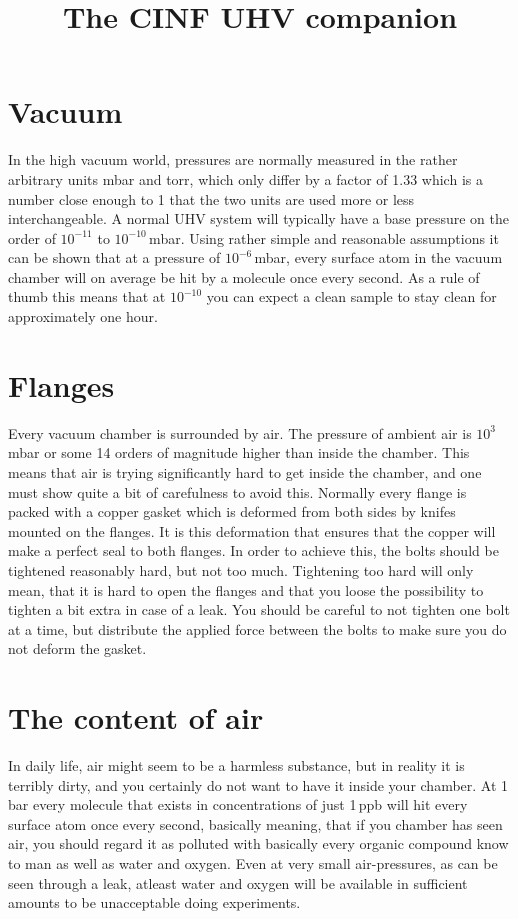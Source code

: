 \documentclass[a4paper,english]{article}
\begin{document}
\title{The CINF UHV companion}

\maketitle

\section{Vacuum}
In the high vacuum world, pressures are normally measured in the rather arbitrary units mbar and torr, which only differ by a factor of 1.33 which is a number close enough to 1 that the two units are used more or less interchangeable. A normal UHV system will typically have a base pressure on the order of $10^{-11}$ to $10^{-10}$\,mbar. Using rather simple and reasonable assumptions it can be shown that at a pressure of $10^{-6}$\,mbar, every surface atom in the vacuum chamber will on average be hit by a molecule once every second. As a rule of thumb this means that at $10^{-10}$ you can expect a clean sample to stay clean for approximately one hour.

\section{Flanges}
Every vacuum chamber is surrounded by air. The pressure of ambient air is $10^3$\,mbar or some 14 orders of magnitude higher than inside the chamber. This means that air is trying significantly hard to get inside the chamber, and one must show quite a bit of carefulness to avoid this. Normally every flange is packed with a copper gasket which is deformed from both sides by knifes mounted on the flanges. It is this deformation that ensures that the copper will make a perfect seal to both flanges. In order to achieve this, the bolts should be tightened reasonably hard, but not too much. Tightening too hard will only mean, that it is hard to open the flanges and that you loose the possibility to tighten a bit extra in  case of a leak. You should be careful to not tighten one bolt at a time, but distribute the applied force between the bolts to make sure you do not deform the gasket.

\section{The content of air}
In daily life, air might seem to be a harmless substance, but in reality it is terribly dirty, and you certainly do not want to have it inside your chamber. At 1\,bar every molecule that exists in concentrations of just 1\,ppb will hit every surface atom once every second, basically meaning, that if you chamber has seen air, you should regard it as polluted with basically every organic compound know to man as well as water and oxygen. Even at very small air-pressures, as can be seen through a leak, atleast water and oxygen will be available in sufficient amounts to be unacceptable doing experiments.
\end{document}
